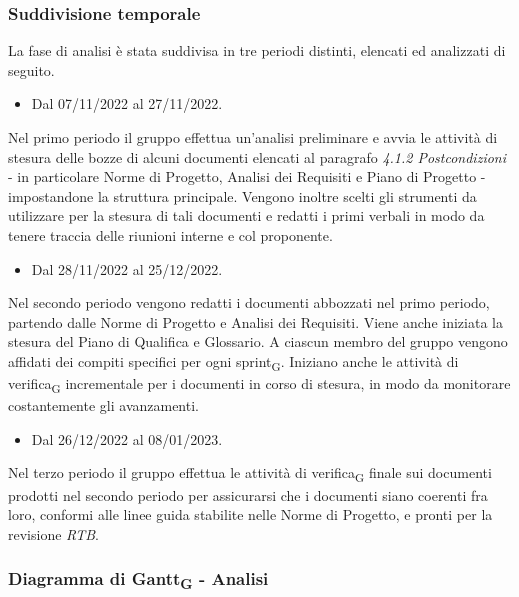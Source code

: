 \subsubsection{Suddivisione temporale}
La fase di analisi è stata suddivisa in tre periodi distinti, elencati ed analizzati di seguito.

\:
\begin{itemize}
    \item Dal 07/11/2022 al 27/11/2022.
\end{itemize}
Nel primo periodo il gruppo effettua un’analisi preliminare e avvia le attività di stesura delle bozze di alcuni documenti elencati al paragrafo \textit{4.1.2 Postcondizioni} - in particolare Norme di Progetto, Analisi dei Requisiti e Piano di Progetto - impostandone la struttura principale. Vengono inoltre scelti gli strumenti da utilizzare per la stesura di tali documenti e redatti i primi verbali in modo da tenere traccia delle riunioni interne e col proponente.

\:
\begin{itemize}
    \item Dal 28/11/2022 al 25/12/2022.
\end{itemize}
Nel secondo periodo vengono redatti i documenti abbozzati nel primo periodo, partendo dalle Norme di Progetto e Analisi dei Requisiti. Viene anche iniziata la stesura del Piano di Qualifica e Glossario.
A ciascun membro del gruppo vengono affidati dei compiti specifici per ogni sprint\textsubscript{G}. Iniziano anche le attività di verifica\textsubscript{G} incrementale per i documenti in corso di stesura, in modo da monitorare costantemente gli avanzamenti.

\:
\begin{itemize}
    \item Dal 26/12/2022 al 08/01/2023.
\end{itemize}
Nel terzo periodo il gruppo effettua le attività di verifica\textsubscript{G} finale sui documenti prodotti nel secondo periodo per assicurarsi che i documenti siano coerenti fra loro, conformi alle linee guida stabilite nelle Norme di Progetto, e pronti per la revisione \textit{RTB}.

\subsubsection{Diagramma di Gantt\textsubscript{G} - Analisi}

